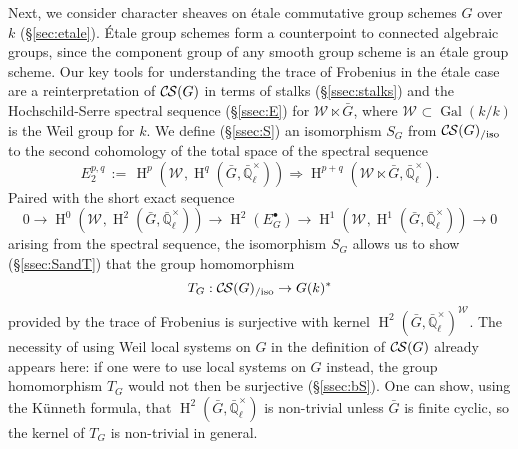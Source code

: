\documentclass[10pt]{amsart}
\theoremstyle{plain}
\theoremstyle{definition}
\newcommand{\EE}{\mathbb{\bar Q}_\ell}
\newcommand{\bFq}{\bar{k}}
\newcommand{\Fq}{k}
\newcommand{\EEx}{\EE^\times}
\newcommand{\Weil}[1]{\mathcal{W}_{#1}}
\DeclareMathOperator{\Gal}{Gal}
\DeclareMathOperator{\Hom}{Hom}
\DeclareMathOperator{\Hh}{H}
\newcommand{\ceq}{{\, :=\, }}
\newcommand{\TrFrob}[1]{T_{#1}}
\newcommand{\gcs}[1]{{\mathcal{\bar #1}}}
\newcommand{\CS}{{\mathcal{C\hskip-0.8pt S}}}
\newcommand{\CSiso}[1]{\CS(#1)_{/\text{iso}}}
\newcommand{\bG}{\bar{G}}
\begin{document}
Next, we consider character sheaves on \'etale commutative group schemes $G$ over $\Fq$ (\S\ref{sec:etale}).
\'Etale group schemes form a counterpoint to connected algebraic groups, since the component group of any smooth group scheme is an \'etale group scheme.
Our key tools for understanding the trace of Frobenius in the \'etale case 
are a reinterpretation of $\CS(G)$ in terms of stalks (\S\ref{ssec:stalks}) and 
 the Hochschild-Serre spectral sequence (\S\ref{ssec:E}) for $\Weil{} \ltimes \bG$, where $\Weil{} \subset \Gal(\Fq/\Fq)$ is the Weil group for $\Fq$.
We define (\S\ref{ssec:S}) an isomorphism $S_G$ from $\CSiso{G}$ to the second cohomology of the total space of the spectral sequence
\[
E_2^{p,q} \ceq \Hh^p(\Weil{}, \Hh^q(\bG, \EEx)) \Rightarrow \Hh^{p+q}(\Weil{} \ltimes \bG, \EEx).
\]
Paired with the short exact sequence
\[
  0 \to \Hh^0(\Weil{},\Hh^2(\bG,\EEx)) \to \Hh^2(E^\bullet_G) \to \Hh^1(\Weil{},\Hh^1(\bG,\EEx)) \to 0
\]
arising from the spectral sequence, the isomorphism $S_G$ allows us to show (\S\ref{ssec:SandT}) that 
the group homomorphism 
\[
\TrFrob{G}: \CSiso{G} \to G(\Fq)^*
\]
provided by the trace of Frobenius is surjective with kernel $\Hh^2(\bG,\EEx)^{\Weil{}}$.
The necessity of using Weil local systems on $G$ in the definition of $\CS(G)$ already appears here:  if one were to use local systems on $G$ instead, the group homomorphism $\TrFrob{G}$ would not then be surjective (\S \ref{ssec:bS}). 
One can show, using the K\"unneth formula, that $\Hh^2(\bG,\EEx)$ is non-trivial unless $\bG$ is finite cyclic, so the kernel of $\TrFrob{G}$ is non-trivial in general.


\end{document}
